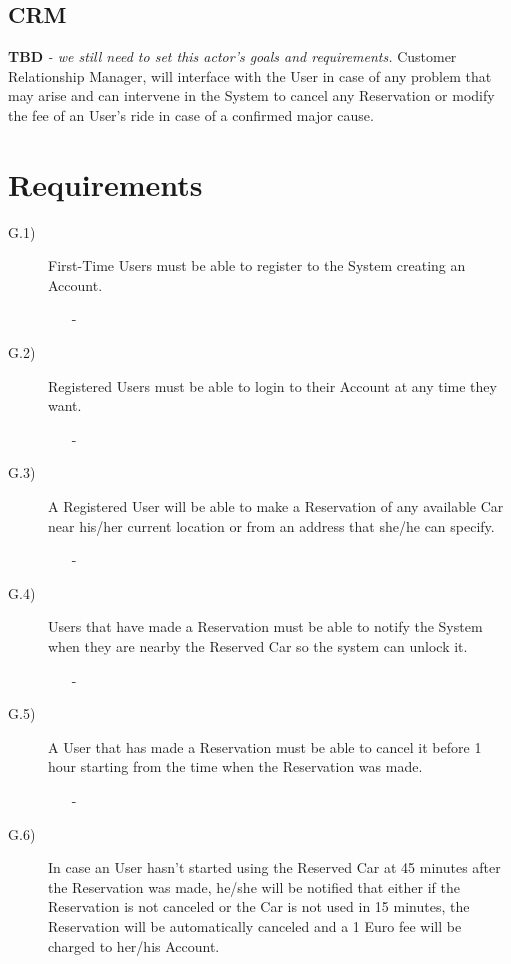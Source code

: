 \documentclass[a4paper]{article}
\begin{document}
\subsection {CRM}
\textbf{TBD} \textit{- we still need to set this actor's goals and requirements.}
Customer Relationship Manager, will interface with the User in case of any problem that may arise and can intervene in the System to cancel any Reservation or modify the fee of an User's ride in case of a confirmed major cause.

\section{Requirements}
\begin{description}
\item [G.1)]First-Time Users must be able to register to the System creating an Account. 
\begin{itemize}
	\item[-]
\end{itemize}
\item [G.2)]Registered Users must be able to login to their Account at any time they want.
\begin{itemize}
	\item[-]
\end{itemize}
\item [G.3)]A Registered User will be able to make a Reservation of any available Car near his/her current location or from an address that she/he can specify.
\begin{itemize}
	\item[-]
\end{itemize}
\item [G.4)]Users that have made a Reservation must be able to notify the System when they are nearby the Reserved Car so the system can unlock it.
\begin{itemize}
	\item[-]
\end{itemize}
\item [G.5)]A User that has made a Reservation must be able to cancel it before 1 hour starting from the time when the Reservation was made.
\begin{itemize}
	\item[-]
\end{itemize}
\item [G.6)]In case an User hasn't started using the Reserved Car at 45 minutes after the Reservation was made, he/she will be notified that either if the Reservation is not canceled or the Car is not used in 15 minutes, the Reservation will be automatically canceled and a 1 Euro fee will be charged to her/his Account.

\end{description}
\end{document}
